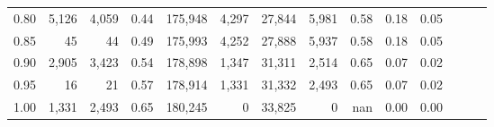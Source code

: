 \begin{tabular}{rrrrrrrrrrrrrr}
0.80 &   5,126 &  4,059 &  0.44 &  175,948 &    4,297 &  27,844 &   5,981 &  0.58 &  0.18 &      0.05 \\
0.85 &      45 &     44 &  0.49 &  175,993 &    4,252 &  27,888 &   5,937 &  0.58 &  0.18 &      0.05 \\
0.90 &   2,905 &  3,423 &  0.54 &  178,898 &    1,347 &  31,311 &   2,514 &  0.65 &  0.07 &      0.02 \\
0.95 &      16 &     21 &  0.57 &  178,914 &    1,331 &  31,332 &   2,493 &  0.65 &  0.07 &      0.02 \\
1.00 &   1,331 &  2,493 &  0.65 &  180,245 &        0 &  33,825 &       0 &   nan &  0.00 &      0.00 \\
\bottomrule
\end{tabular}
